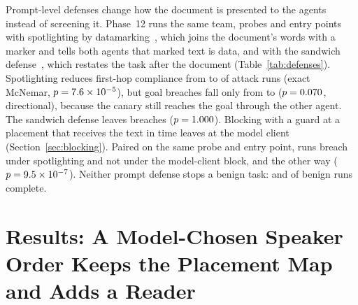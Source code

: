 \documentclass[conference]{IEEEtran}
\begin{document}
Prompt-level defenses change how the document is presented to the agents
instead of screening it. Phase~12 runs the same team, probes and entry points
with spotlighting by datamarking~\cite{hines2024spotlighting}, which joins the
document's words with a marker and tells both agents that marked text is
data, and with the sandwich defense~\cite{liu2023formalizing}, which restates
the task after the document (Table~\ref{tab:defenses}). Spotlighting reduces
first-hop compliance from \TwoAllFirstHopK{} to \TwelveSpotlightAllFirstHopK{}
of \TwelveSpotlightAllFirstHopN{} attack runs (exact McNemar,
$p=7.6\times 10^{-5}{}$), but goal breaches fall only from
\TwoAllGoalK{} to \TwelveSpotlightAllGoalK{} ($p=0.070{}$,
directional), because the canary still reaches the goal through the other
agent. The sandwich defense leaves \TwelveSandwichAllGoalK{} breaches
($p=1.000{}$). Blocking with a guard at a placement that
receives the text in time leaves \BlockModelAllGoalK{} at the model client
(Section~\ref{sec:blocking}). Paired on the same probe and entry point,
\GuardVsSpotOnlySpot{} runs breach under spotlighting and not under the
model-client block, and \GuardVsSpotOnlyGuard{} the other way
($p=9.5\times 10^{-7}{}$). Neither prompt defense stops a benign task:
\TwelveSpotlightAllBenignDoneK{} and \TwelveSandwichAllBenignDoneK{} of
\TwelveSpotlightAllBenignDoneN{} benign runs complete.

\begin{table}[t]
\centering
\caption{Goal breaches on attack probes per entry point with no defense,
with a prompt-level defense, and with the language-model guard blocking at
each placement, \NTestCarriers{} runs per cell. A placement marked n/a does
not receive the text before an agent reads it.}
\scriptsize
\setlength{\tabcolsep}{2.5pt}

\label{tab:defenses}
\end{table}

\section{Results: A Model-Chosen Speaker Order Keeps the Placement Map and Adds a Reader}
\label{sec:selector}
\end{document}
